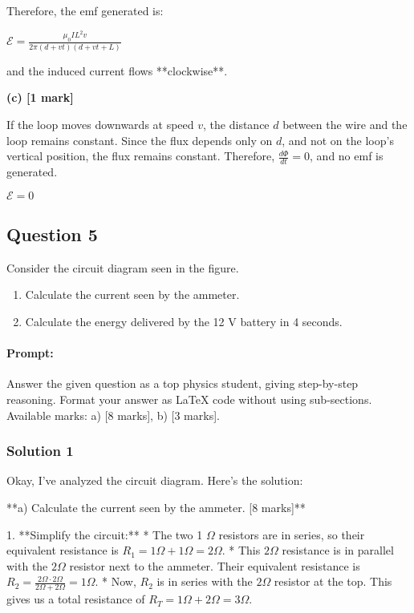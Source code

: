 \documentclass{article}
\begin{document}
Therefore, the emf generated is:

$\boxed{\mathcal{E} = \frac{\mu_0 I L^2 v}{2 \pi (d + vt)(d + vt + L)}}$

and the induced current flows **clockwise**.


\textbf{(c) [1 mark]}

If the loop moves downwards at speed $v$, the distance $d$ between the wire and the loop remains constant.  Since the flux depends only on $d$, and not on the loop's vertical position, the flux remains constant.  Therefore, $\frac{d\Phi}{dt} = 0$, and no emf is generated.

$\boxed{\mathcal{E} = 0}$


\subsection{Question 5}
Consider the circuit diagram seen in the figure.
\begin{enumerate}
    \item Calculate the current seen by the ammeter.
    \item Calculate the energy delivered by the 12 V battery in 4 seconds.
\end{enumerate}


\paragraph{Prompt: \\} 
Answer the given question as a top physics student, giving step-by-step reasoning. Format your answer as LaTeX code without using sub-sections. Available marks: a) [8 marks], b) [3 marks].

\subsubsection{Solution 1}
Okay, I've analyzed the circuit diagram. Here's the solution:

**a) Calculate the current seen by the ammeter. [8 marks]**

1. **Simplify the circuit:**
    * The two 1 $\Omega$ resistors are in series, so their equivalent resistance is $R_1 = 1 \Omega + 1 \Omega = 2 \Omega$.
    * This $2 \Omega$ resistance is in parallel with the $2 \Omega$ resistor next to the ammeter. Their equivalent resistance is $R_2 = \frac{2 \Omega \cdot 2 \Omega}{2 \Omega + 2 \Omega} = 1 \Omega$.
    * Now, $R_2$ is in series with the $2 \Omega$ resistor at the top. This gives us a total resistance of $R_T = 1 \Omega + 2 \Omega = 3 \Omega$.
\end{document}
